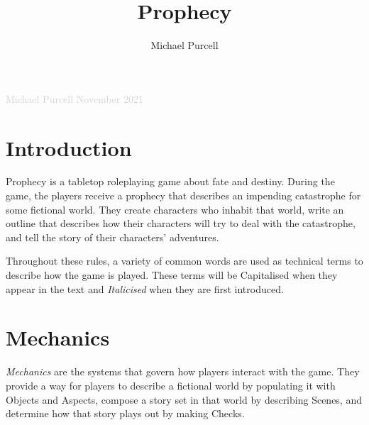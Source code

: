 \documentclass[12pt, a5paper, parskip=half-]{scrartcl}
\title{Prophecy}
\author{Michael Purcell}
\begin{document}
\begin{titlepage}
		\enlargethispage{5\baselineskip}

         \setmainfont{Cinzel Decorative}
		\centering{
			{\fontsize{60}{72}\selectfont
			{\textcolor{violet!75}{pROpHecY}}}
		}
		
		\setmainfont{URWClassico}
		\vspace{10mm}
		\centering{\Large{{\textcolor{lightgray}
{A tabletop roleplaying game\\ \smallskip about fate and destiny}}}}

		\vfill
		\raggedright{\Large{{\textcolor{lightgray}{Michael Purcell \hfill November 2021}}}}

\end{titlepage}



\setmainfont{URWClassico}
\normalsize
\raggedright
\section*{Introduction}
Prophecy is a tabletop roleplaying game about fate and destiny.
During the game, the players receive a prophecy that describes an impending catastrophe for some fictional world.
They create characters who inhabit that world, write an outline that describes how their characters will try to deal with the catastrophe, and tell the story of their characters' adventures.

Throughout these rules, a variety of common words are used as technical terms to describe how the game is played.
These terms will be Capitalised when they appear in the text and \emph{Italicised} when they are first introduced.

\newpage

\section*{Mechanics}    
\emph{Mechanics} are the systems that govern how players interact with the game.
They provide a way for players to describe a fictional world by populating it with Objects and Aspects, compose a story set in that world by describing Scenes, and determine how that story plays out by making Checks.
\end{document}

